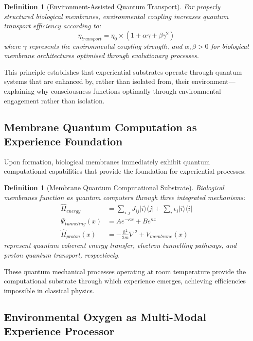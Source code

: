 \documentclass{article}
\newtheorem{definition}[theorem]{Definition}
\begin{document}
\begin{definition}[Environment-Assisted Quantum Transport]
For properly structured biological membranes, environmental coupling increases quantum transport efficiency according to:
$$\eta_{transport} = \eta_0 \times (1 + \alpha \gamma + \beta \gamma^2)$$
where $\gamma$ represents the environmental coupling strength, and $\alpha, \beta > 0$ for biological membrane architectures optimised through evolutionary processes.
\end{definition}

This principle establishes that experiential substrates operate through quantum systems that are enhanced by, rather than isolated from, their environment—explaining why consciousness functions optimally through environmental engagement rather than isolation.

\subsection{Membrane Quantum Computation as Experience Foundation}

Upon formation, biological membranes immediately exhibit quantum computational capabilities that provide the foundation for experiential processes:

\begin{definition}[Membrane Quantum Computational Substrate]
Biological membranes function as quantum computers through three integrated mechanisms:
\begin{align}
\hat{H}_{energy} &= \sum_{i,j} J_{ij} |i\rangle\langle j| + \sum_i \epsilon_i |i\rangle\langle i| \\
\Psi_{tunneling}(x) &= A e^{-\kappa x} + B e^{\kappa x} \\
\hat{H}_{proton}(x) &= -\frac{\hbar^2}{2m}\nabla^2 + V_{membrane}(x)
\end{align}
represent quantum coherent energy transfer, electron tunnelling pathways, and proton quantum transport, respectively.
\end{definition}

These quantum mechanical processes operating at room temperature provide the computational substrate through which experience emerges, achieving efficiencies impossible in classical physics.

\subsection{Environmental Oxygen as Multi-Modal Experience Processor}
\end{document}
